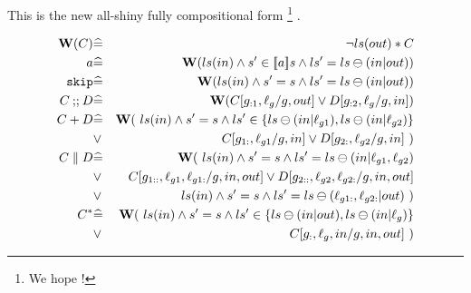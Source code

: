 This is the new all-shiny fully compositional form%
\footnote{We hope !}%
.

\begin{eqnarray*}
   \mathbf{W}(C)
   &\widehat=&
   \lnot ls(out) * C
\\ a
   &\widehat=&
   \mathbf{W}(ls(in) \land s' \in [\![{a}]\!] s \land ls'=ls \ominus (in|out))
\\ \texttt{skip}
   &\widehat=&
   \mathbf{W}(ls(in) \land s' = s \land ls'=ls \ominus (in|out))
\\ C \mathbin{;\!;} D
   &\widehat=&
   \mathbf{W}(C[g_{:1},\ell_g/g,out] \lor D[g_{:2},\ell_g/g,in])
\\ C + D
   &\widehat=&
   \mathbf{W}(~ls(in)
   \land s' = s
   \land ls' \in \{ ls \ominus (in|\ell_{g1}), ls \ominus (in|\ell_{g2})\}
\\ &\lor&
   C[g_{1:},\ell_{g1}/g,in] \lor D[g_{2:},\ell_{g2}/g,in]~)
\\ C \parallel D
   &\widehat=&
   \mathbf{W}(~ls(in)
   \land s' = s
   \land ls'= ls \ominus (in|\ell_{g1},\ell_{g2})
\\ &\lor&
   C[g_{1::},\ell_{g1},\ell_{g1:}/g,in,out]
   \lor D[g_{2::},\ell_{g2},\ell_{g2:}/g,in,out]
\\ &\lor&
   ls(in)
   \land s' = s
   \land ls'= ls \ominus (\ell_{g1:},\ell_{g2:}|out)~)
\\ C^*
   &\widehat=&
   \mathbf{W}(~ls(in)
   \land s' = s
   \land ls' \in \{ ls \ominus (in|out), ls \ominus (in|\ell_g)\}
\\ &\lor&
   C[g_{:},\ell_g,in/g,in,out]~)
\end{eqnarray*}
